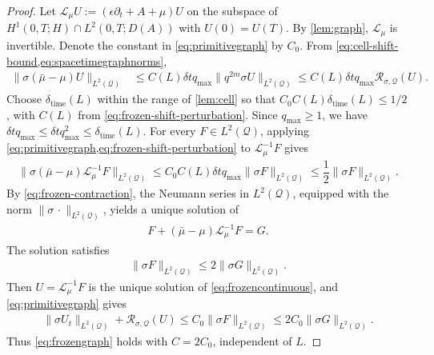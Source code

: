 \documentclass[print,wide,eng]{draft}
\begin{document}
\begin{proof}
Let $\mathscr L_\mu U:=(\epsilon\partial_t+A+\mu)U$ on the subspace of $H^1(0,T;H)\cap L^2(0,T;D(A))$ with $U(0)=U(T)$. By \cref{lem:graph}, $\mathscr L_\mu$ is invertible. Denote the constant in \cref{eq:primitivegraph} by $C_0$. From \cref{eq:cell-shift-bound,eq:spacetimegraphnorms},
%
\begin{align}\label{eq:frozen-shift-perturbation}
\|\sigma(\bar\mu-\mu)U\|_{L^2(\mathcal Q)}
&\leq C(L){\delta t}q_{\max}\|q^{2m}\sigma U\|_{L^2(\mathcal Q)}
\leq C(L){\delta t}q_{\max}\mathcal R_{\sigma,\mathcal Q}(U).
\end{align}
%
Choose $\delta_{\mathrm{time}}(L)$ within the range of \cref{lem:cell} so that $C_0C(L)\delta_{\mathrm{time}}(L)\leq1/2$, with $C(L)$ from \cref{eq:frozen-shift-perturbation}. Since $q_{\max}\geq1$, we have ${\delta t}q_{\max}\leq {\delta t}q_{\max}^2\leq\delta_{\mathrm{time}}(L)$. For every $F\in L^2(\mathcal Q)$, applying \cref{eq:primitivegraph,eq:frozen-shift-perturbation} to $\mathscr L_\mu^{-1}F$ gives
%
\begin{align}\label{eq:frozen-contraction}
\|\sigma(\bar\mu-\mu)\mathscr L_\mu^{-1}F\|_{L^2(\mathcal Q)}
\leq C_0C(L){\delta t}q_{\max}\|\sigma F\|_{L^2(\mathcal Q)}
\leq\dfrac12\|\sigma F\|_{L^2(\mathcal Q)}.
\end{align}
%
By \cref{eq:frozen-contraction}, the Neumann series in $L^2(\mathcal Q)$, equipped with the norm $\|\sigma\,\cdot\|_{L^2(\mathcal Q)}$, yields a unique solution of
%
\begin{align*}
F+(\bar\mu-\mu)\mathscr L_\mu^{-1}F=G.
\end{align*}
%
The solution satisfies
%
\begin{align*}
\|\sigma F\|_{L^2(\mathcal Q)}\leq2\|\sigma G\|_{L^2(\mathcal Q)}.
\end{align*}
%
Then $U=\mathscr L_\mu^{-1}F$ is the unique solution of \cref{eq:frozencontinuous}, and \cref{eq:primitivegraph} gives
%
\begin{align*}
\|\sigma U_t\|_{L^2(\mathcal Q)}+\mathcal R_{\sigma,\mathcal Q}(U)
\leq C_0\|\sigma F\|_{L^2(\mathcal Q)}
\leq2C_0\|\sigma G\|_{L^2(\mathcal Q)}.
\end{align*}
%
Thus \cref{eq:frozengraph} holds with $C=2C_0$, independent of $L$.
\end{proof}
%
\end{document}

